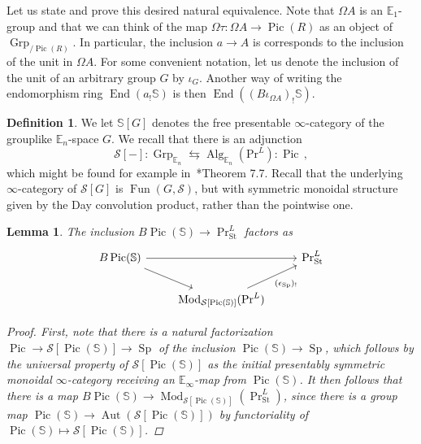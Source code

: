 \documentclass[10pt]{amsart}
\theoremstyle{plain}
\newtheorem{lemma}[theorem]{Lemma}
\theoremstyle{definition}
\newtheorem{definition}[theorem]{Definition}
\DeclareMathOperator{\Aut}{Aut}
\DeclareMathOperator{\Mod}{Mod}
\DeclareMathOperator{\End}{End}
\DeclareMathOperator{\Grp}{Grp}
\DeclareMathOperator{\Sp}{Sp}
\DeclareMathOperator{\Fun}{Fun}
\DeclareMathOperator{\Pic}{Pic}
\DeclareMathOperator{\Alg}{Alg}
\def\on{\operatorname}
\newcommand{\St}{\mathrm{St}}
\newcommand{\bE}{\mathbb{E}}
\newcommand{\bS}{\mathbb{S}}
\newcommand{\cS}{\mathcal{S}}
\begin{document}
Let us state and prove this desired natural equivalence.
Note that $\Omega A$ is an $\bE_1$-group and that we can think of the map $\Omega \tau : \Omega A \to \Pic(R)$ as an object of $\Grp_{/\Pic(R)}$.
In particular, the inclusion $a \to A$ is corresponds to the inclusion of the unit in $\Omega A$.
For some convenient notation, let us denote the inclusion of the unit of an arbitrary group $G$ by $\iota_G$.
Another way of writing the endomorphism ring $\End(a_! \bS)$ is then $\End((B\iota_{\Omega A})_! \bS)$.


\begin{definition}
  We let $\bS[G]$ denotes the free presentable $\infty$-category of the grouplike $\bE_n$-space $G$.
  We recall that there is an adjunction
  \[
  \cS[-] : \Grp_{\bE_n} \leftrightarrows \Alg_{\bE_n}(\mathrm{Pr}^{L}) : \Pic \,,
  \]
  which might be found for example in~\cite{andogepner}*{Theorem 7.7}.
  Recall that the underlying $\infty$-category of $\cS[G]$ is $\Fun(G,\cS)$, but with symmetric monoidal structure given by the Day convolution product, rather than the pointwise one.
\end{definition}


\begin{lemma} \label{lem:BPicPrLSt_factorization}
  The inclusion $B\Pic(\bS) \to \Pr^{L}_{\St}$ factors as
  \[
  \begin{tikzcd}
    B\Pic(\bS) \arrow[rr] \arrow[dr] &  & \Pr^{L}_{\St} \\
    & \Mod_{\cS[\Pic(\bS)]}(\Pr^L) \arrow[ur,"{(\epsilon_{\Sp})_!}"'] &
  \end{tikzcd}
  \]
  \begin{proof}
    First, note that there is a natural factorization $\Pic \to \cS[\Pic(\bS)] \to \Sp$ of the inclusion $\Pic(\bS) \to \Sp$, which follows by the universal property of $\cS[\Pic(\bS)]$ as the initial presentably symmetric monoidal $\infty$-category receiving an $\bE_{\infty}$-map from $\Pic(\bS)$.
    It then follows that there is a map $B \Pic(\bS) \to \Mod_{\cS[\Pic(\bS)]}(\on{Pr}^{L}_{\St})$, since there is a group map $\Pic(\bS) \to \Aut(\cS [\Pic(\bS)])$ by functoriality of $\Pic(\bS) \mapsto \cS[\Pic(\bS)]$.
  \end{proof}
\end{lemma}
\end{document}
